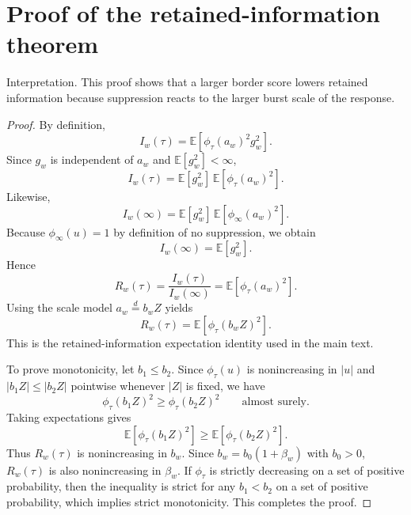 \documentclass[12pt,letterpaper]{article}
\begin{document}
\section*{Proof of the retained-information theorem}\label{app:prooffisher}

Interpretation. This proof shows that a larger border score lowers retained information because suppression reacts to the larger burst scale of the response.

\begin{proof}
By definition,
\begin{equation}
I_w(\tau)
=
\mathbb{E}\!\left[\phi_{\tau}(a_w)^2 g_w^2\right].
\label{eq:appfisherdef}
\end{equation}
Since $g_w$ is independent of $a_w$ and $\mathbb{E}[g_w^2] < \infty$,
\begin{equation}
I_w(\tau)
=
\mathbb{E}[g_w^2]\,
\mathbb{E}\!\left[\phi_{\tau}(a_w)^2\right].
\label{eq:appfactor}
\end{equation}
Likewise,
\begin{equation}
I_w(\infty)
=
\mathbb{E}[g_w^2]\,
\mathbb{E}\!\left[\phi_{\infty}(a_w)^2\right].
\label{eq:appinfty}
\end{equation}
Because $\phi_{\infty}(u)=1$ by definition of no suppression, we obtain
\begin{equation}
I_w(\infty)=\mathbb{E}[g_w^2].
\label{eq:appinfty2}
\end{equation}
Hence
\begin{equation}
R_w(\tau)
=
\frac{I_w(\tau)}{I_w(\infty)}
=
\mathbb{E}\!\left[\phi_{\tau}(a_w)^2\right].
\label{eq:appratio}
\end{equation}
Using the scale model $a_w \overset{d}{=} b_w Z$ yields
\begin{equation}
R_w(\tau)
=
\mathbb{E}\!\left[\phi_{\tau}(b_w Z)^2\right].
\label{eq:appscaled}
\end{equation}
This is the retained-information expectation identity used in the main text.

To prove monotonicity, let $b_1 \leq b_2$. Since $\phi_{\tau}(u)$ is nonincreasing in $|u|$ and $|b_1 Z| \leq |b_2 Z|$ pointwise whenever $|Z|$ is fixed, we have
\begin{equation}
\phi_{\tau}(b_1 Z)^2 \geq \phi_{\tau}(b_2 Z)^2
\qquad \text{almost surely.}
\label{eq:appmono}
\end{equation}
Taking expectations gives
\begin{equation}
\mathbb{E}\!\left[\phi_{\tau}(b_1 Z)^2\right]
\geq
\mathbb{E}\!\left[\phi_{\tau}(b_2 Z)^2\right].
\label{eq:appmonoexp}
\end{equation}
Thus $R_w(\tau)$ is nonincreasing in $b_w$. Since $b_w=b_0(1+\beta_w)$ with $b_0>0$, $R_w(\tau)$ is also nonincreasing in $\beta_w$. If $\phi_{\tau}$ is strictly decreasing on a set of positive probability, then the inequality is strict for any $b_1 < b_2$ on a set of positive probability, which implies strict monotonicity. This completes the proof.
\end{proof}
\end{document}
